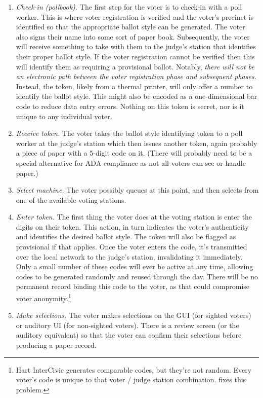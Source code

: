 \begin{enumerate}
\item {\em Check-in (pollbook).}
The first step for the voter is to check-in with a poll worker. This is where voter registration is verified and the voter's precinct is identified so that the appropriate ballot style can be generated. The voter also signs their name into some sort of paper book. Subsequently, the voter will receive something to take with them to the judge's station that identifies their proper ballot style. If the voter registration cannot be verified then this will identify them as requiring a provisional ballot. Notably, {\em there will not be an electronic path between the voter registration phase and subsequent phases}. Instead, the token, likely from a thermal printer, will only offer a number to identify the ballot style. This might also be encoded as a one-dimensional bar code to reduce data entry errors. Nothing on this token is secret, nor is it unique to any individual voter.

\item {\em Receive token.}
The voter takes the ballot style identifying token to a poll worker at the judge's station which then issues another token, again probably a piece of paper with a 5-digit code on it. (There will probably need to be a special alternative for ADA compliance as not all voters can see or handle paper.) 

\item {\em Select machine.}
The voter possibly queues at this point, and then selects from one of the available voting stations.

\item  {\em Enter token.}
The first thing the voter does at the voting station is enter the digits on their token. 
This action, in turn indicates the voter's authenticity and identifies the desired ballot style. The token will also be flagged as provisional if that applies. Once the voter enters the code, it's transmitted over the local network to the judge's station, invalidating it immediately. Only a small number of these codes will ever be active at any time, allowing codes to be generated randomly and reused through the day. There will be no permanent record binding this code to the voter, as that could compromise voter anonymity.\footnote{Hart InterCivic generates comparable codes, but they're not random. Every voter's code is unique to that voter / judge station combination. \projname fixes this problem.}

\item {\em Make selections.}
The voter makes selections on the GUI (for sighted voters) or auditory UI (for non-sighted voters). There is a review screen (or the auditory equivalent) so that the voter can confirm their selections before producing a paper record.


\end{enumerate}

